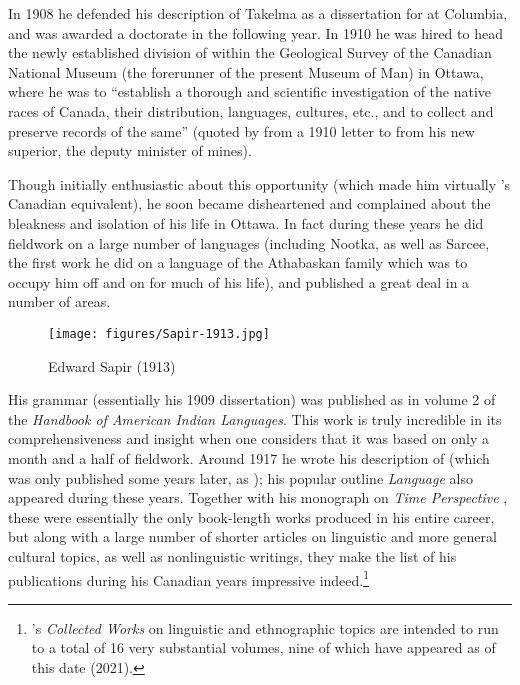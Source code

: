 In 1908 he defended his description of {Takelma} as a dissertation for
{\Boas} at Colum\-bia, and was awarded a doctorate in the following
year. In 1910 he was hired to head the newly established division of
 within the Geological Survey of the Canadian National
Museum (the forerunner of the present Museum of Man) in Ottawa, where
he was to ``establish a thorough and scientific investigation of the
native races of Canada, their distribution, languages, cultures, etc.,
and to collect and preserve records of the same'' (quoted by
\citet[64]{murray81:sapir.canada} from a 1910 letter to {\Sapir} from his
new superior, the deputy minister of mines).

Though initially enthusiastic about this opportunity (which made him
virtually {\Boas}'s Canadian equivalent), he soon became disheartened and
complained about the bleakness and isolation of his life in Ottawa. In
fact during these years he did fieldwork on a large number of
languages (including Nootka, as well as Sarcee, the first work he did
on a language of the Athabaskan family which was to occupy him off and
on for much of his life), and published a great deal in a number of
areas.

\begin{wrapfigure}{l}{.4\textwidth}
  \texttt{[image: figures/Sapir-1913.jpg]}
  \caption{Edward Sapir (1913)}
  \label{fig:ch.sapir.sapir_1913}
\end{wrapfigure}
His  grammar (essentially his 1909 dissertation) was
published as \citealt{sapir22:takelma} in volume 2 of the
\textsl{Handbook of American Indian Languages}. This work is truly
incredible in its comprehensiveness and insight when one considers
that it was based on only a month and a half of fieldwork. Around 1917
he wrote his description of  (which was only published
some years later, as \citealt{sapir30:s.paiute}); his popular outline
\textsl{Language} \citep{sapir21:language} also appeared during these
years. Together with his monograph on \textsl{Time Perspective}
\citep{sapir16:time.perspective}, these were essentially the only
book-length works {\Sapir} produced in his entire career, but along with
a large number of shorter articles on linguistic and more general
cultural topics, as well as nonlinguistic writings, they make the list
of his publications during his Canadian years impressive
indeed.\footnote{{\Sapir}'s \textsl{Collected Works} on linguistic and
  ethnographic topics are intended to run to a total of 16 very
  substantial volumes, nine of which have appeared as of this date
  (2021).}

